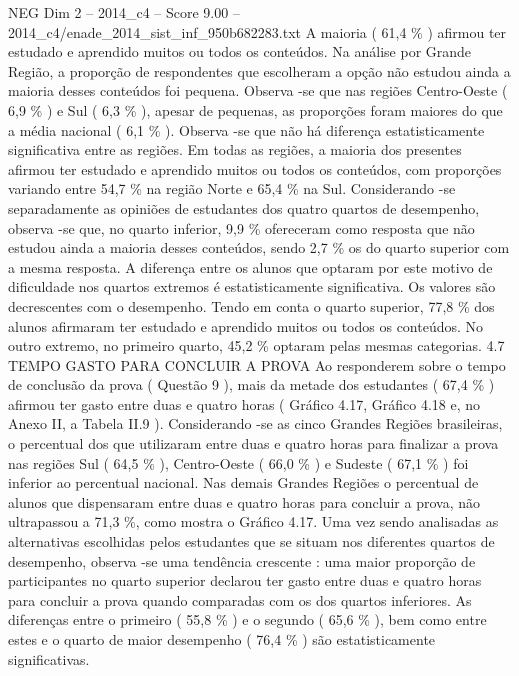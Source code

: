 \begin{textsample}{NEG Dim 2 – 2014\_c4 – Score 9.00 – 2014\_c4/enade\_2014\_sist\_inf\_950b682283.txt}
A maioria ( 61,4 \% ) afirmou ter estudado e aprendido muitos ou todos os conteúdos.
Na análise por Grande Região, a proporção de respondentes que escolheram a opção não estudou ainda a maioria desses conteúdos foi pequena.
Observa -se que nas regiões Centro-Oeste ( 6,9 \% ) e Sul ( 6,3 \% ), apesar de pequenas, as proporções foram maiores do que a média nacional ( 6,1 \% ).
Observa -se que não há diferença estatisticamente significativa entre as regiões.
Em todas as regiões, a maioria dos presentes afirmou ter estudado e aprendido muitos ou todos os conteúdos, com proporções variando entre 54,7 \% na região Norte e 65,4 \% na Sul.
Considerando -se separadamente as opiniões de estudantes dos quatro quartos de desempenho, observa -se que, no quarto inferior, 9,9 \% ofereceram como resposta que não estudou ainda a maioria desses conteúdos, sendo 2,7 \% os do quarto superior com a mesma resposta.
A diferença entre os alunos que optaram por este motivo de dificuldade nos quartos extremos é estatisticamente significativa.
Os valores são decrescentes com o desempenho.
Tendo em conta o quarto superior, 77,8 \% dos alunos afirmaram ter estudado e aprendido muitos ou todos os conteúdos.
No outro extremo, no primeiro quarto, 45,2 \% optaram pelas mesmas categorias. 4.7 TEMPO GASTO PARA CONCLUIR A PROVA Ao responderem sobre o tempo de conclusão da prova ( Questão 9 ), mais da metade dos estudantes ( 67,4 \% ) afirmou ter gasto entre duas e quatro horas ( Gráfico 4.17, Gráfico 4.18 e, no Anexo II, a Tabela II.9 ).
Considerando -se as cinco Grandes Regiões brasileiras, o percentual dos que utilizaram entre duas e quatro horas para finalizar a prova nas regiões Sul ( 64,5 \% ), Centro-Oeste ( 66,0 \% ) e Sudeste ( 67,1 \% ) foi inferior ao percentual nacional.
Nas demais Grandes Regiões o percentual de alunos que dispensaram entre duas e quatro horas para concluir a prova, não ultrapassou a 71,3 \%, como mostra o Gráfico 4.17.
Uma vez sendo analisadas as alternativas escolhidas pelos estudantes que se situam nos diferentes quartos de desempenho, observa -se uma tendência crescente : uma maior proporção de participantes no quarto superior declarou ter gasto entre duas e quatro horas para concluir a prova quando comparadas com os dos quartos inferiores.
As diferenças entre o primeiro ( 55,8 \% ) e o segundo ( 65,6 \% ), bem como entre estes e o quarto de maior desempenho ( 76,4 \% ) são estatisticamente significativas.

\end{textsample}
